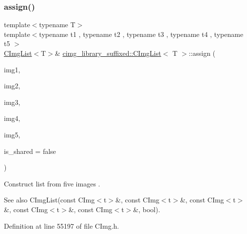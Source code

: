 \subsubsection{\texorpdfstring{assign()}{assign()}\hspace{0.1cm}{\footnotesize\ttfamily [12/18]}}
{\footnotesize\ttfamily template$<$typename T$>$ \\
template$<$typename t1 , typename t2 , typename t3 , typename t4 , typename t5 $>$ \\
\hyperlink{structcimg__library__suffixed_1_1CImgList}{C\+Img\+List}$<$T$>$\& \hyperlink{structcimg__library__suffixed_1_1CImgList}{cimg\+\_\+library\+\_\+suffixed\+::\+C\+Img\+List}$<$ T $>$\+::assign (\begin{DoxyParamCaption}\item[{const \hyperlink{structcimg__library__suffixed_1_1CImg}{C\+Img}$<$ t1 $>$ \&}]{img1,  }\item[{const \hyperlink{structcimg__library__suffixed_1_1CImg}{C\+Img}$<$ t2 $>$ \&}]{img2,  }\item[{const \hyperlink{structcimg__library__suffixed_1_1CImg}{C\+Img}$<$ t3 $>$ \&}]{img3,  }\item[{const \hyperlink{structcimg__library__suffixed_1_1CImg}{C\+Img}$<$ t4 $>$ \&}]{img4,  }\item[{const \hyperlink{structcimg__library__suffixed_1_1CImg}{C\+Img}$<$ t5 $>$ \&}]{img5,  }\item[{const bool}]{is\+\_\+shared = {\ttfamily false} }\end{DoxyParamCaption})\hspace{0.3cm}{\ttfamily [inline]}}



Construct list from five images . 

\begin{DoxySeeAlso}{See also}
C\+Img\+List(const C\+Img$<$t$>$\&, const C\+Img$<$t$>$\&, const C\+Img$<$t$>$\&, const C\+Img$<$t$>$\&, const C\+Img$<$t$>$\&, bool). 
\end{DoxySeeAlso}


Definition at line 55197 of file C\+Img.\+h.

\mbox{\label{structcimg__library__suffixed_1_1CImgList_a0e075a83b7c2e0af55772642d679c921}} 
